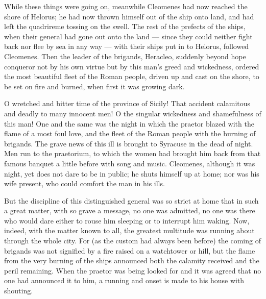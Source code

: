  While these things were going on, meanwhile Cleomenes had now reached the shore of Helorus; he had now thrown himself out of the ship onto land, and had left the quadrireme tossing on the swell. The rest of the prefects of the ships, when their general had gone out onto the land --- since they could neither fight back nor flee by sea in any way --- with their ships put in to Helorus, followed Cleomenes. Then the leader of the brigands, Heracleo, suddenly beyond hope conqueror not by his own virtue but by this man's greed and wickedness, ordered the most beautiful fleet of the Roman people, driven up and cast on the shore, to be set on fire and burned, when first it was growing dark.

 O wretched and bitter time of the province of Sicily! That accident calamitous and deadly to many innocent men! O the singular wickedness and shamefulness of this man! One and the same was the night in which the praetor blazed with the flame of a most foul love, and the fleet of the Roman people with the burning of brigands. The grave news of this ill is brought to Syracuse in the dead of night. Men run to the praetorium, to which the women had brought him back from that famous banquet a little before with song and music. Cleomenes, although it was night, yet does not dare to be in public; he shuts himself up at home; nor was his wife present, who could comfort the man in his ills.

 But the discipline of this distinguished general was so strict at home that in such a great matter, with so grave a message, no one was admitted, no one was there who would dare either to rouse him sleeping or to interrupt him waking. Now, indeed, with the matter known to all, the greatest multitude was running about through the whole city. For (as the custom had always been before) the coming of brigands was not signified by a fire raised on a watchtower or hill, but the flame from the very burning of the ships announced both the calamity received and the peril remaining. When the praetor was being looked for and it was agreed that no one had announced it to him, a running and onset is made to his house with shouting.

